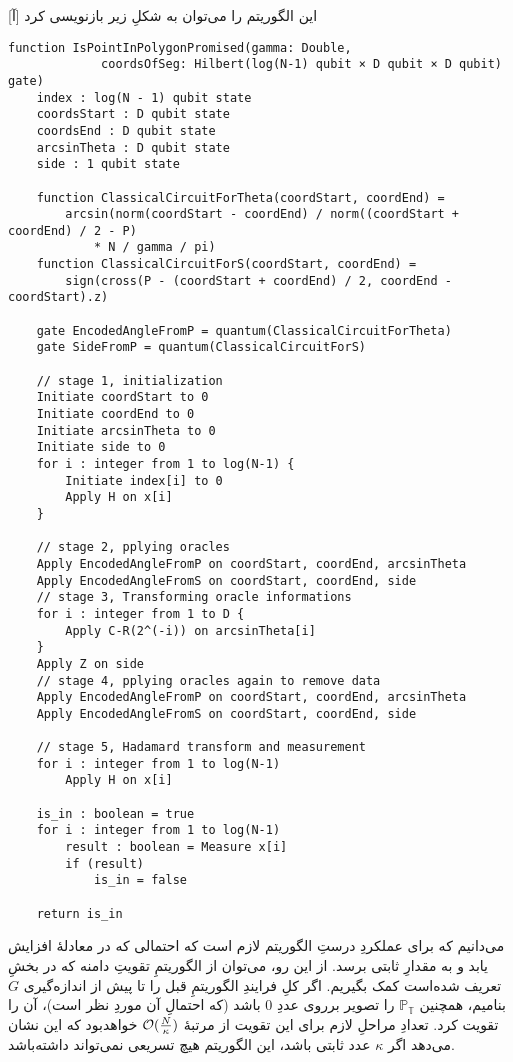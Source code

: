 این الگوریتم را می‌توان به شکلِ زیر بازنویسی کرد
[آ]
\begin{latin}
\begin{lstlisting}
function IsPointInPolygonPromised(gamma: Double,
             coordsOfSeg: Hilbert(log(N-1) qubit × D qubit × D qubit) gate)
    index : log(N - 1) qubit state
    coordsStart : D qubit state
    coordsEnd : D qubit state
    arcsinTheta : D qubit state
    side : 1 qubit state

    function ClassicalCircuitForTheta(coordStart, coordEnd) = 
        arcsin(norm(coordStart - coordEnd) / norm((coordStart + coordEnd) / 2 - P) 
            * N / gamma / pi)
    function ClassicalCircuitForS(coordStart, coordEnd) = 
        sign(cross(P - (coordStart + coordEnd) / 2, coordEnd - coordStart).z)
        
    gate EncodedAngleFromP = quantum(ClassicalCircuitForTheta)
    gate SideFromP = quantum(ClassicalCircuitForS)
    
    // stage 1, initialization
    Initiate coordStart to 0
    Initiate coordEnd to 0
    Initiate arcsinTheta to 0
    Initiate side to 0
    for i : integer from 1 to log(N-1) {
        Initiate index[i] to 0
        Apply H on x[i]
    }
    
    // stage 2, pplying oracles
    Apply EncodedAngleFromP on coordStart, coordEnd, arcsinTheta
    Apply EncodedAngleFromS on coordStart, coordEnd, side
    // stage 3, Transforming oracle informations
    for i : integer from 1 to D {
        Apply C-R(2^(-i)) on arcsinTheta[i]
    }
    Apply Z on side
    // stage 4, pplying oracles again to remove data
    Apply EncodedAngleFromP on coordStart, coordEnd, arcsinTheta
    Apply EncodedAngleFromS on coordStart, coordEnd, side
    
    // stage 5, Hadamard transform and measurement
    for i : integer from 1 to log(N-1)
        Apply H on x[i]
        
    is_in : boolean = true
    for i : integer from 1 to log(N-1)
        result : boolean = Measure x[i]
        if (result)
            is_in = false

    return is_in
\end{lstlisting}
\end{latin}

می‌دانیم که برای عملکردِ درستِ الگوریتم لازم است که احتمالی که در معادلهٔ  افزایش یابد و به مقدارِ ثابتی برسد. از این رو، می‌توان از الگوریتمِ تقویتِ دامنه که در بخشِ  تعریف شده‌است کمک بگیریم.
اگر کلِ فرایندِ الگوریتمِ قبل را تا پیش از اندازه‌گیری $G$ بنامیم، همچنین 
$\mathbb{P_T}$
را تصویر برروی عددِ $0$ باشد (که احتمالِ آن موردِ نظر است)، آن را تقویت کرد.
تعدادِ مراحلِ لازم برای این تقویت از مرتبهٔ
$\mathcal{O}(\frac{N}{\kappa})$
خواهدبود که این نشان می‌دهد اگر $\kappa$ عدد ثابتی باشد، این الگوریتم هیچ تسریعی نمی‌تواند داشته‌باشد.

